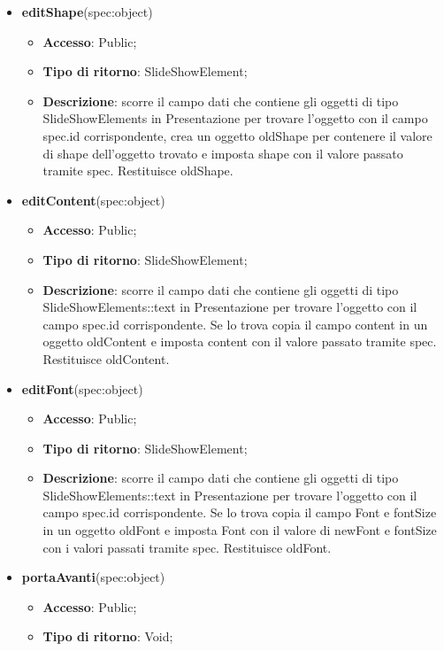 {\begin{itemize}
\begin{itemize}
			\end{itemize}
			\item \textbf{editShape}(spec:object)
			\begin{itemize}
				\item \textbf{Accesso}: Public;
				\item \textbf{Tipo di ritorno}: SlideShowElement;
				\item \textbf{Descrizione}: scorre il campo dati che contiene gli oggetti di tipo SlideShowElements in Presentazione per trovare l’oggetto con il campo spec.id corrispondente, crea un oggetto oldShape per contenere il valore di shape dell’oggetto trovato e imposta shape con il valore passato tramite spec. Restituisce oldShape.
			\end{itemize}
			\item \textbf{editContent}(spec:object)
			\begin{itemize}
				\item \textbf{Accesso}: Public;
				\item \textbf{Tipo di ritorno}: SlideShowElement;
				\item \textbf{Descrizione}: scorre il campo dati che contiene gli oggetti di tipo SlideShowElements::text in Presentazione per trovare l’oggetto con il campo spec.id corrispondente. Se lo trova copia il campo content in un oggetto oldContent e imposta content con il valore passato tramite spec. Restituisce oldContent.
			\end{itemize}
			\item \textbf{editFont}(spec:object)
			\begin{itemize}
				\item \textbf{Accesso}: Public;
				\item \textbf{Tipo di ritorno}: SlideShowElement;
				\item \textbf{Descrizione}: scorre il campo dati che contiene gli oggetti di tipo SlideShowElements::text in Presentazione per trovare l’oggetto con il campo spec.id corrispondente. Se lo trova copia il campo Font e fontSize in un oggetto oldFont e imposta Font con il valore di newFont e fontSize con i valori passati tramite spec. Restituisce oldFont.
			\end{itemize}
			\item \textbf{portaAvanti}(spec:object)
			\begin{itemize}
				\item \textbf{Accesso}: Public;
				\item \textbf{Tipo di ritorno}: Void;

\end{itemize}
\end{itemize}}
